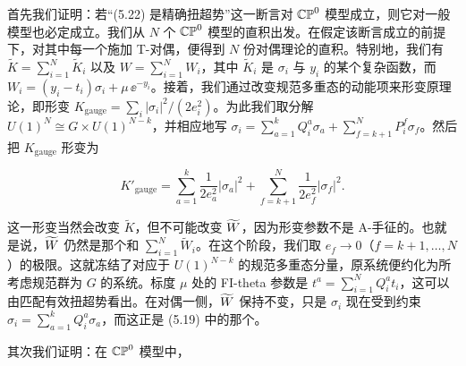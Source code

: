 

首先我们证明：若“(5.22) 是精确扭超势”这一断言对 $\mathbb{CP}^0$ 模型成立，则它对一般模型也必定成立。我们从 $N$ 个 $\mathbb{CP}^0$ 模型的直积出发。在假定该断言成立的前提下，对其中每一个施加 T-对偶，便得到 $N$ 份对偶理论的直积。特别地，我们有 $\tilde{K}=\sum_{i=1}^{N}\tilde{K}_i$ 以及 $W=\sum_{i=1}^{N}W_i$，其中 $\tilde{K}_i$ 是 $\sigma_i$ 与 $y_i$ 的某个复杂函数，而 $W_i=(y_i-t_i)\sigma_i+\mu\,\ee^{-y_i}$。接着，我们通过改变规范多重态的动能项来形变原理论，即形变 $K_{\mathrm{gauge}}=\sum_i|\sigma_i|^2/(2e_i^2)$。为此我们取分解 $U(1)^N\cong G\times U(1)^{N-k}$，并相应地写 $\sigma_i=\sum_{a=1}^{k}Q_i^a\sigma_a+\sum_{f=k+1}^{N}P_i^f\sigma_f$。然后把 $K_{\mathrm{gauge}}$ 形变为

\begin{equation}
    K'_{\mathrm{gauge}}=\sum_{a=1}^{k}\frac{1}{2e_a^2}|\sigma_a|^2+\sum_{f=k+1}^{N}\frac{1}{2e_f^2}|\sigma_f|^2.
    \tag{5.23}
\end{equation}

这一形变当然会改变 $\tilde{K}$，但不可能改变 $\widetilde{W}$，因为形变参数不是 A-手征的。也就是说，$\widetilde{W}$ 仍然是那个和 $\sum_{i=1}^{N}\tilde{W}_i$。在这个阶段，我们取 $e_f\to0$（$f=k+1,\dots,N$）的极限。这就冻结了对应于 $U(1)^{N-k}$ 的规范多重态分量，原系统便约化为所考虑规范群为 $G$ 的系统。标度 $\mu$ 处的 FI-theta 参数是 $t^a=\sum_{i=1}^{N}Q_i^a t_i$，这可以由匹配有效扭超势看出。在对偶一侧，$\widetilde{W}$ 保持不变，只是 $\sigma_i$ 现在受到约束 $\sigma_i=\sum_{a=1}^{k}Q_i^a\sigma_a$，而这正是 (5.19) 中的那个。



其次我们证明：在 $\mathbb{CP}^0$ 模型中，

